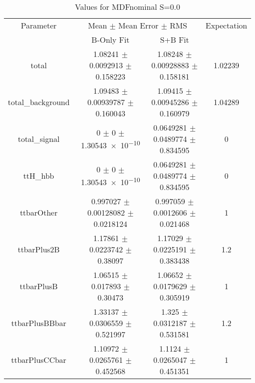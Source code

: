 \begin{table}
\centering
\caption{Values for MDFnominal S=0.0}
\begin{tabular}{cccc}
\toprule
Parameter & \multicolumn{2}{c}{Mean $\pm$ Mean Error $\pm$ RMS} & Expectation\\
 & B-Only Fit & S+B Fit & \\
\midrule
total & \num{1.08241} $\pm$ \num{0.0092913} $\pm$ \num{0.158223} & \num{1.08248} $\pm$ \num{0.00928883} $\pm$ \num{0.158181} & \num{1.02239}\\
total\_background & \num{1.09483} $\pm$ \num{0.00939787} $\pm$ \num{0.160043} & \num{1.09415} $\pm$ \num{0.00945286} $\pm$ \num{0.160979} & \num{1.04289}\\
total\_signal & \num{0} $\pm$ \num{0} $\pm$ \num{1.30543e-10} & \num{0.0649281} $\pm$ \num{0.0489774} $\pm$ \num{0.834595} & \num{0}\\
ttH\_hbb & \num{0} $\pm$ \num{0} $\pm$ \num{1.30543e-10} & \num{0.0649281} $\pm$ \num{0.0489774} $\pm$ \num{0.834595} & \num{0}\\
ttbarOther & \num{0.997027} $\pm$ \num{0.00128082} $\pm$ \num{0.0218124} & \num{0.997059} $\pm$ \num{0.0012606} $\pm$ \num{0.021468} & \num{1}\\
ttbarPlus2B & \num{1.17861} $\pm$ \num{0.0223742} $\pm$ \num{0.38097} & \num{1.17029} $\pm$ \num{0.0225191} $\pm$ \num{0.383438} & \num{1.2}\\
ttbarPlusB & \num{1.06515} $\pm$ \num{0.017893} $\pm$ \num{0.30473} & \num{1.06652} $\pm$ \num{0.0179629} $\pm$ \num{0.305919} & \num{1}\\
ttbarPlusBBbar & \num{1.33137} $\pm$ \num{0.0306559} $\pm$ \num{0.521997} & \num{1.325} $\pm$ \num{0.0312187} $\pm$ \num{0.531581} & \num{1.2}\\
ttbarPlusCCbar & \num{1.10972} $\pm$ \num{0.0265761} $\pm$ \num{0.452568} & \num{1.1124} $\pm$ \num{0.0265047} $\pm$ \num{0.451351} & \num{1}\\
\bottomrule
\end{tabular}
\end{table}